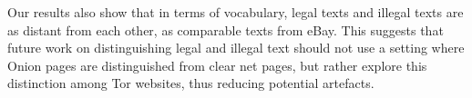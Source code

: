 \documentclass[11pt,a4paper,table]{article}
\begin{document}
  Our results also show that in terms of vocabulary, legal texts and illegal texts are as distant from each other, as 
  comparable texts from eBay.
  This suggests that future work on distinguishing legal and illegal text should not use a setting where Onion pages
    are distinguished from clear net pages, but rather explore this distinction among Tor websites, 
    thus reducing potential artefacts.




\end{document}
